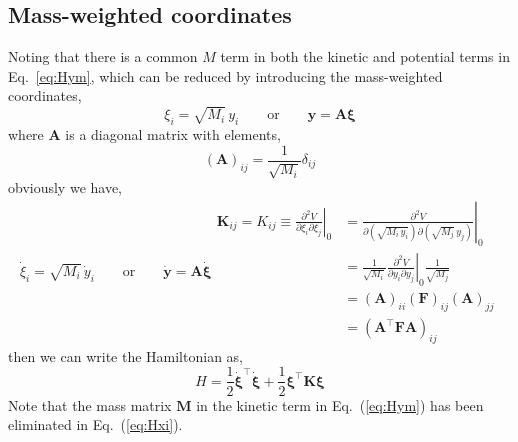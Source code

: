 \documentclass[a4paper,notitlepage,preprint]{revtex4-1}
\newcommand\mbf{\mathbf}
\begin{document}
\subsection{Mass-weighted coordinates}
Noting that there is a common $M$ term in both the kinetic and potential terms in Eq.~\ref{eq:Hym}, which can be reduced by introducing the mass-weighted coordinates,
\begin{equation}
	\xi_i = \sqrt{M_i}\,y_i \qquad \text{or} \qquad \mbf{y} = \mbf{A}\bm{\xi}
	\label{eq:y_to_xi}
\end{equation}
\noindent where $\mbf{A}$ is a diagonal matrix with elements,
\begin{equation}
	(\mbf{A})_{ij} = \frac{1}{\sqrt{M_i}}\delta_{ij}
	\label{eq:Amele}
\end{equation}
\noindent obviously we have,
\begin{subequations}
	\begin{equation}
		\dot{\xi}_i = \sqrt{M_i}\, \dot{y}_i \qquad \text{or} \qquad \dot{\mbf{y}} = \mbf{A}\dot{\bm{\xi}}
		\label{eq:xi}
	\end{equation}
	\begin{equation}
		\begin{split}
		\mbf{K}_{ij} = K_{ij} \equiv \left.\frac{\partial^2 V}{\partial \xi_i \partial\xi_j}\right\vert_0 &= \left.\frac{\partial^2 V}{\partial(\sqrt{M_i\,y_i}) \partial(\sqrt{M_j}\,y_j)}\right\vert_0 \\
		&= \frac{1}{\sqrt{M_i}}\left.\frac{\partial^2 V}{\partial y_i \partial y_j}\right\vert_0 \frac{1}{\sqrt{M_j}} \\
		&= (\mbf{A})_{ii}(\mbf{F})_{ij}(\mbf{A})_{jj} \\
		&= \left(\mbf{A}^\top\mbf{FA}\right)_{ij}
		\end{split}
		\label{eq:2nd_deriv_V}
	\end{equation}
\end{subequations}
\noindent then we can write the Hamiltonian as,
\begin{equation}
	H = \frac{1}{2}\dot{\bm\xi}^\top\dot{\bm\xi} + \frac{1}{2}\bm{\xi}^\top\mbf{K}\bm{\xi}
	\label{eq:Hxi}
\end{equation}
\noindent Note that the mass matrix $\mbf{M}$ in the kinetic term in Eq.~(\ref{eq:Hym}) has been eliminated in  Eq.~(\ref{eq:Hxi}).
\end{document}
